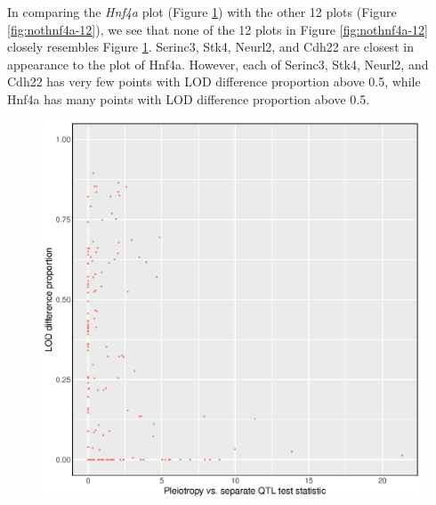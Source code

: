 \documentclass{article}
\begin{document}
In comparing the \emph{Hnf4a} plot (Figure \ref{fig:hnf4a}) with the other 12 plots (Figure \ref{fig:nothnf4a-12}), we see that none of the 12 plots in Figure \ref{fig:nothnf4a-12} closely resembles Figure \ref{fig:hnf4a}. Serinc3, Stk4, Neurl2, and Cdh22 are closest in appearance to the plot of Hnf4a. However, each of Serinc3, Stk4, Neurl2, and Cdh22 has very few points with LOD difference proportion above 0.5, while Hnf4a has many points with LOD difference proportion above 0.5.

\begin{figure}
    \centering
    \includegraphics[width = \textwidth]{../Rmd/Hnf4a-lod-diff-prop-v-lrt.eps}
    \caption{}
    \label{fig:hnf4a}
\end{figure}
\end{document}
